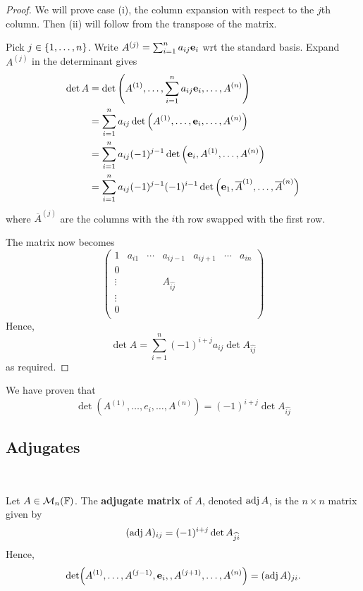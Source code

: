 \documentclass[a4paper]{article}
\begin{document}
\begin{proof}
	We will prove case (i), the column expansion with respect to the $ j $th column.
	Then (ii) will follow from the transpose of the matrix.

	Pick $ j \in \qty{1, \dots, n} $.
	Write $ A^{(j)} = \sum_{i=1}^n a_{ij} {\bf e}_i $ wrt the standard basis. Expand $A^{(j)}$ in the determinant gives
	\begin{align*}
		\det A & = \det\qty(A^{(1)}, \dots, \sum_{i=1}^n a_{ij} {\bf e}_i, \dots, A^{(n)})                                    \\
		       & = \sum_{i=1}^n a_{ij} \det\qty(A^{(1)}, \dots, {\bf e}_i, \dots, A^{(n)})                                    \\
		       & = \sum_{i=1}^n a_{ij} (-1)^{j-1} \det\qty({\bf e}_i, A^{(1)}, \dots, A^{(n)})                                \\
		       & = \sum_{i=1}^n a_{ij} (-1)^{j-1} (-1)^{i-1} \det\qty({\bf e}_1, \overline A^{(1)}, \dots, \overline A^{(n)})
	\end{align*}
	where $ \overline{A}^{(j)} $ are the columns with the $i$th row swapped with the first row. 

	The matrix now becomes 
	\[
		\begin{pmatrix}
			1 & a_{i 1} & \cdots & a_{i j-1} &  a_{i j+1} & \cdots & a_{i n} \\
			0 &  &  &  &  &  &  \\
			\vdots &  &  & A_{\widehat{ij}} &  &  & \\
			\vdots &  &  &  &  &  & \\
			0 &  &  &  &  &  & \\
		\end{pmatrix}
	\]
	Hence,
	\[
		\det A = \sum_{i=1}^n (-1)^{i+j} a_{ij} \det A_{\widehat{ij}}
	\]
	as required.
\end{proof}
We have proven that
\[
	\det (A^{(1)}, \dots, e_i, \dots, A^{(n)}) = (-1)^{i+j} \det A_{\widehat{ij}}
\]

\subsection{Adjugates}\ \vspace{-1.5em}
\begin{definition}
	Let $ A \in {\mathcal{M}}_n({\mathbb{F}}) $.
	The \textbf{adjugate matrix} of $ A $, denoted $ \operatorname{adj} A $, is the $ n \times n $ matrix given by
	\[
		(\operatorname{adj} A)_{ij} = (-1)^{i+j} \det A_{\widehat{ji}}
	\]
	Hence,
	\[
		\det (A^{(1)}, \dots, A^{(j-1)}, {\bf e}_i, , A^{(j+1)},\dots, A^{(n)}) = (\operatorname{adj} A)_{ji}.
	\]
\end{definition}
\end{document}
